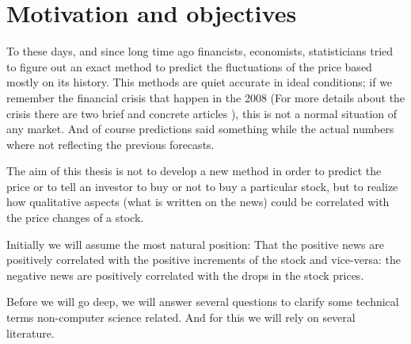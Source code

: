 	\section{Motivation and objectives}
	
	To these days, and since long time ago financists, economists, statisticians tried to figure out an exact method 
	to predict the fluctuations of the price based mostly on its history. This methods are quiet accurate in ideal
	conditions; if we remember the financial crisis that happen in the 2008 (For more details about the crisis there 
	are two brief and concrete articles \cite[section: abstract \& origins]{R2010} \cite[p. 1-3]{P2009}), this is not a normal situation of any 
	market. And of course predictions said something while the actual numbers where not reflecting the previous
	forecasts. 
	
	The aim of this thesis is not to develop a new method in order to predict the price or to tell an investor to buy
	or not to buy a particular stock, but to realize how qualitative aspects (what is written on the news) could be 
	correlated with the price changes of a stock.
	
	Initially we will assume the most natural position: That the positive news are positively correlated with the 
	positive increments of the stock and vice-versa: the negative news are positively correlated with the drops
	in the stock prices.
	
	Before we will go deep, we will answer several questions to clarify some technical terms non-computer science
	related. And for this we will rely on several literature.
	
	
